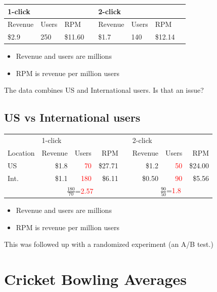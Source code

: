 \documentclass[
  10pt,
  b5paper]{book}
\providecommand{\tightlist}{%
  \setlength{\itemsep}{0pt}\setlength{\parskip}{0pt}}
\begin{document}
\begin{longtable}[]{@{}llllllll@{}}
\toprule
1-click & & & & 2-click & & & \\
\midrule
\endhead
Revenue & Users & RPM & & Revenue & Users & RPM & \\
\$2.9 & 250 & \$11.60 & & \$1.7 & 140 & \$12.14 & \\
\bottomrule
\end{longtable}

\begin{itemize}
\tightlist
\item
  Revenue and users are millions
\item
  RPM is revenue per million users
\end{itemize}

The data combines US and International users. Is that an issue?

\hypertarget{us-vs-international-users}{%
\subsection*{US vs International users}\label{us-vs-international-users}}

\begin{tabular}{l r r r r r r r}
& \multicolumn{3}{l}{1-click} & & \multicolumn{3}{l}{2-click}\\
Location   & Revenue & Users   & RPM && Revenue & Users & RPM\\
US & \$1.8   & \textcolor{red}{70}  &\$27.71 && \$1.2 & \textcolor{red}{50}  & \$24.00\\
Int. & \$1.1   & \textcolor{red}{180} &\$6.11  && \$0.50 & \textcolor{red}{90} & \$5.56\\
& \multicolumn{3}{c}{$\frac{180}{70}$=\textcolor{red}{2.57}} & & \multicolumn{3}{c}{$\frac{90}{50}$=\textcolor{red}{1.8}}\\
\end{tabular}

\begin{itemize}
\tightlist
\item
  Revenue and users are millions
\item
  RPM is revenue per million users
\end{itemize}

This was followed up with a randomized experiment (an A/B test.)

\hypertarget{cricket-bowling-averages}{%
\section{Cricket Bowling Averages}\label{cricket-bowling-averages}}
\end{document}
